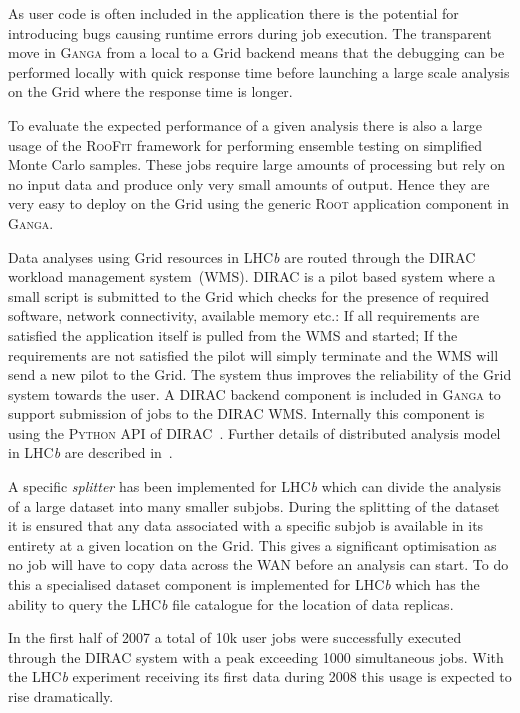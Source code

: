 \documentclass{elsart}
\def\lhcb {LHC{\em b\/}\xspace}
\def\dirac{DIRAC\xspace}
\def\ganga {\textsc{Ganga}\xspace}
\def\python {\textsc{Python}\xspace}
\def\root {\textsc{Root}\xspace}
\def\grid {Grid\xspace}
\def\roofit{\textsc{RooFit}\xspace}
\begin{document}
As user code is often included in the application there is the potential for
introducing bugs causing runtime errors during job execution. The transparent
move in \ganga from a local to a \grid backend means that the debugging can be
performed locally with quick response time before launching a large scale
analysis on the \grid where the response time is longer.

To evaluate the expected performance of a given analysis there is also a large
usage of the \roofit \cite{RooFit} framework for performing ensemble testing on simplified
Monte Carlo samples. These jobs require large amounts of processing but rely
on no input data and produce only very small amounts of output. Hence they are
very easy to deploy on the \grid using the generic \root application component
in \ganga.

Data analyses using \grid resources in \lhcb are routed through the
\dirac~\cite{DIRAC} workload management system~(WMS). \dirac is a pilot based
system where a small script is submitted to the \grid which checks for the
presence of required software, network connectivity, available memory etc.: If
all requirements are satisfied the application itself is pulled from the WMS
and started; If the requirements are not satisfied the pilot will simply
terminate and the WMS will send a new pilot to the \grid. The system thus
improves the reliability of the \grid system towards the user. A \dirac backend
component is included in \ganga to support submission of jobs to the \dirac
WMS. Internally this component is using the \python API of
\dirac~\cite{DIRACAPI}.  Further details of distributed analysis model in
\lhcb are described in~\cite{lhcb:2005jj}.

A specific \emph{splitter} has been implemented for \lhcb which can divide the
analysis of a large dataset into many smaller subjobs. During the splitting of
the dataset it is ensured that any data associated with a specific subjob is
available in its entirety at a given location on the \grid. This gives a
significant optimisation as no job will have to copy data across the WAN
before an analysis can start. To do this a specialised dataset component is
implemented for \lhcb which has the ability to query the \lhcb file catalogue
for the location of data replicas.

In the first half of 2007 a total of 10k user jobs were successfully
executed through the \dirac system with a peak exceeding 1000 simultaneous
jobs. With the \lhcb experiment receiving its first data during 2008 this
usage is expected to rise dramatically.
\end{document}
